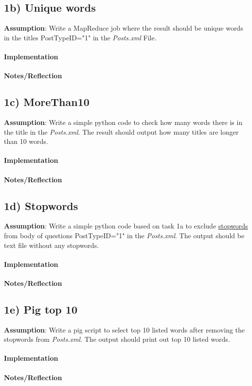 \documentclass[fleqn,10pt]{wlscirep}
\begin{document}
\subsection*{1b) Unique words}
\textbf{Assumption}: Write a MapReduce job where the result should be unique words in the titles PostTypeID="1" in the \textit{Posts.xml} File. \\ \\
\textbf{Implementation}  \\ \\
\textbf{Notes/Reflection}

\subsection*{1c) MoreThan10}
\textbf{Assumption}: Write a simple python code to check how many words there is in the title in the \textit{Posts.xml}. The result should output how many titles are longer than 10 words.  \\ \\
\textbf{Implementation}  \\ \\
\textbf{Notes/Reflection}

\subsection*{1d) Stopwords}
\textbf{Assumption}: Write a simple python code based on task 1a to exclude \href{https://raw.githubusercontent.com/naimdjon/stopwords/master/stopwords.txt}{stopwords} from body of questions PostTypeID="1" in the \textit{Posts.xml}. The output should be text file without any stopwords. \\ \\
\textbf{Implementation}  \\ \\
\textbf{Notes/Reflection}

\subsection*{1e) Pig top 10}
\textbf{Assumption}: Write a pig script to select top 10 listed words after removing the stopwords from \textit{Posts.xml}. The output should print out top 10 listed words.\\ \\
\textbf{Implementation}  \\ \\
\textbf{Notes/Reflection}
\end{document}
